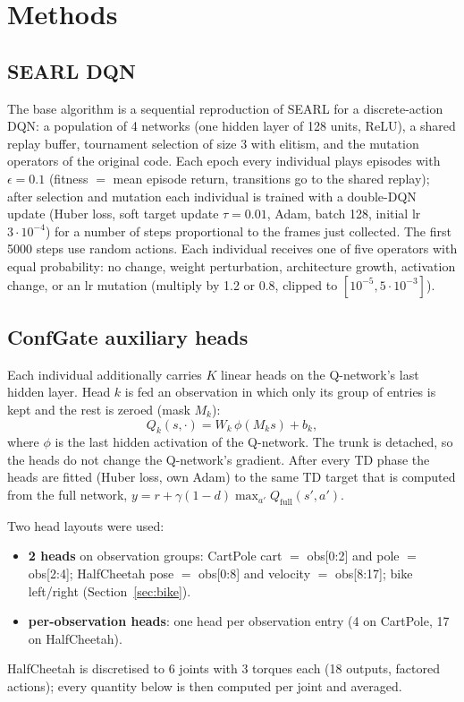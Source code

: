 \documentclass[11pt]{article}
\newcommand{\Qfull}{Q_{\mathrm{full}}}
\begin{document}
\section{Methods}

\subsection{SEARL DQN}
The base algorithm is a sequential reproduction of SEARL for a discrete-action DQN: a population of 4
networks (one hidden layer of 128 units, ReLU), a shared replay buffer, tournament selection of size 3 with elitism,
and the mutation operators of the original code. Each epoch every individual plays episodes with
$\epsilon = 0.1$ (fitness $=$ mean episode return, transitions go to the shared replay); after selection and mutation each
individual is trained with a double-DQN update (Huber loss, soft target update $\tau = 0.01$, Adam, batch 128,
initial lr $3\cdot10^{-4}$) for a number of steps proportional to the frames just collected. The first 5000 steps
use random actions. Each individual receives one of five operators with equal probability: no change, weight
perturbation, architecture growth, activation change, or an lr mutation (multiply by 1.2 or 0.8, clipped to
$[10^{-5}, 5\cdot10^{-3}]$).

\subsection{ConfGate auxiliary heads}
Each individual additionally carries $K$ linear heads on the Q-network's last hidden layer. Head $k$ is
fed an observation in which only its group of entries is kept and the rest is zeroed (mask $M_k$):
\[
  Q_k(s,\cdot) = W_k\,\phi(M_k s) + b_k ,
\]
where $\phi$ is the last hidden activation of the Q-network. The trunk is detached, so the heads do not change the
Q-network's gradient. After every TD phase the heads are fitted (Huber loss, own Adam) to the same TD target that
is computed from the full network, $y = r + \gamma(1-d)\max_{a'}\Qfull(s',a')$.

Two head layouts were used:
\begin{itemize}
  \item \textbf{2 heads} on observation groups: CartPole cart $=$ obs[0:2] and pole $=$ obs[2:4];
        HalfCheetah pose $=$ obs[0:8] and velocity $=$ obs[8:17]; bike left/right (Section~\ref{sec:bike}).
  \item \textbf{per-observation heads}: one head per observation entry (4 on CartPole, 17 on HalfCheetah).
\end{itemize}
HalfCheetah is discretised to 6 joints with 3 torques each (18 outputs, factored actions); every quantity below
is then computed per joint and averaged.
\end{document}
